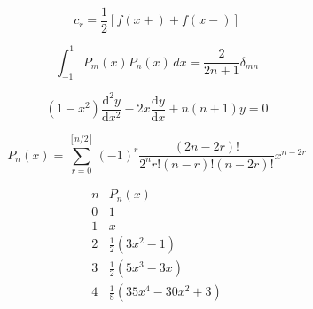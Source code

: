 






\[\begin{equation} c_r = \frac{1}{2}[f(x+) + f(x-)] \end{equation}\]

\[\begin{equation} \int _{-1}^{1}P_{m}(x)P_{n}(x)\,dx={\frac{2}{2n+1}}\delta _{mn} \end{equation}\]

\[\begin{equation} \label{legendiffeq} (1-x^{2})\frac{\mathrm{d}^2y}{\mathrm{d}x^2} - 2x\frac{\mathrm{d}y}{\mathrm{d}x} + n(n+1)y = 0 \end{equation}\]

\[\begin{equation} \label{legenpolydef} P_{n}(x) = \sum_{r=0}^{\left[ n/2 \right]}(-1)^{r}\frac{(2n-2r)!}{2^{n}r!(n-r)!(n-2r)!}x^{n-2r} \end{equation}\]

\[\begin{equation} \label{legenvals} {\begin{array}{r|r}n&P_{n}(x)\\\hline 0&1\\1&x\\2&{\frac {1}{2}}(3x^{2}-1)\\3&{\frac {1}{2}}(5x^{3}-3x)\\4&{\frac {1}{8}}(35x^{4}-30x^{2}+3) \end{array}} \end{equation}\]

